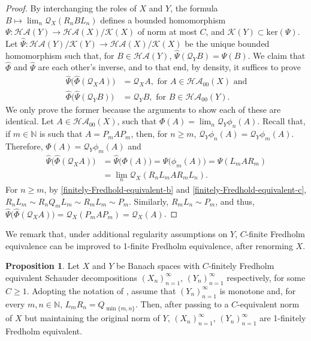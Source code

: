 \documentclass[11pt]{amsart}
\theoremstyle{definition}
\newtheorem{proposition}[theorem]{Proposition}
\newcommand{\N}{\mathbb{N}}
\numberwithin{equation}{section}
\begin{document}
\begin{proof}
By interchanging the roles of $X$ and $Y$, the formula $B\mapsto \lim_n\mathcal{Q}_X(R_nBL_n)$ defines a bounded homomorphism $\Psi:\mathcal{HA}(Y)\to \mathcal{HA}(X)/\mathcal{K}(X)$ of norm at most $C$, and $\mathcal{K}(Y)\subset\mathrm{ker}(\Psi)$. Let $\widehat\Psi:\mathcal{HA}(Y)/\mathcal{K}(Y)\to\mathcal{HA}(X)/\mathcal{K}(X)$ be the unique bounded homomorphism such that, for $B\in\mathcal{HA}(Y)$, $\widehat \Psi(\mathcal{Q}_YB) = \Psi(B)$. We claim that $\hat\Phi$ and $\hat\Psi$ are each other's inverse, and to that end, by density, it suffices to prove
\[
\begin{split}
\hat \Psi\big(\hat\Phi(\mathcal{Q}_XA)\big) &= \mathcal{Q}_XA,\text{ for }A\in\mathcal{HA}_{00}(X)\text{ and}\\
\hat \Phi\big(\hat\Psi(\mathcal{Q}_YB)\big) &= \mathcal{Q}_YB,\text{ for }B\in\mathcal{HA}_{00}(Y).
\end{split}
\]
We only prove the former because the arguments to show each of these are identical. Let $A\in\mathcal{HA}_{00}(X)$, such that $\Phi(A) = \lim_n\mathcal{Q}_Y\phi_n(A)$. Recall that, if $m\in\N$ is such that $A = P_mAP_m$, then, for $n\geq m$, $\mathcal{Q}_Y\phi_n(A) = \mathcal{Q}_Y\phi_m(A)$. Therefore, $\Phi(A) =\mathcal{Q}_Y\phi_m(A)$ and
\[
\begin{split}
\hat \Psi\big(\hat\Phi(\mathcal{Q}_XA)\big) &= \hat \Psi\big(\Phi(A)\big) = \Psi\big(\phi_m(A)\big)=  \Psi(L_mAR_m)\\
&=\lim_n\mathcal{Q}_X(R_nL_mAR_mL_n).
\end{split}
\]
For $n\geq m$, by \ref{finitely-Fredhold-equivalent-b} and \ref{finitely-Fredhold-equivalent-c}, $R_nL_m\sim R_nQ_mL_m \sim R_mL_m \sim P_m$. Similarly, $R_mL_n\sim P_m$, and thus, $\hat \Psi\big(\hat\Phi(\mathcal{Q}_XA)\big) = \mathcal{Q}_X(P_mAP_m) = \mathcal{Q}_X(A)$.
\end{proof}

We remark that, under additional regularity assumptions on $Y$, $C$-finite Fredholm equivalence can be improved to 1-finite Fredholm equivalence, after renorming $X$.

\begin{proposition}
\label{general renorming}
Let $X$ and $Y$ be Banach spaces with $C$-finitely Fredholm equivalent Schauder decompositions $(X_n)_{n=1}^\infty$, $(Y_n)_{n=1}^\infty$ respectively, for some $C\geq 1$. Adopting the notation of , assume that $(Y_n)_{n=1}^\infty$ is monotone and, for every $m,n\in\N$, $L_m R_n = Q_{\min\{m,n\}}$. Then, after passing to a $C$-equivalent norm of $X$ but maintaining the original norm of $Y$, $(X_n)_{n=1}^\infty$, $(Y_n)_{n=1}^\infty$ are 1-finitely Fredholm equivalent.
\end{proposition}
\end{document}
